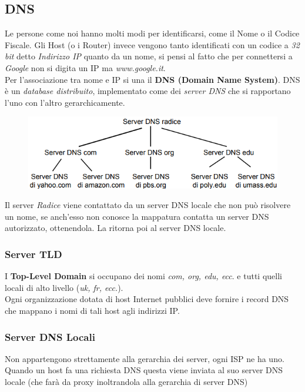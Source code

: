 \documentclass{article}
\begin{document}
        \subsection{DNS}
            Le persone come noi hanno molti modi per identificarsi, come il Nome o il Codice Fiscale. Gli Host (o i Router) invece vengono tanto identificati con un codice a \textit{32 bit} detto \textit{Indirizzo IP} quanto da un nome, si pensi al fatto che per connettersi a \textit{Google} non si digita un IP ma \textit{www.google.it}.\\
            Per l'associazione tra nome e IP si una il \textbf{DNS (Domain Name System)}. DNS è un \textit{database distribuito}, implementato come dei \textit{server DNS} che si rapportano l'uno con l'altro gerarchicamente.\\
            \begin{figure}[H]
                \centering
                \includegraphics[width=\textwidth]{pic/gerarchia_dns.png}
                \label{Gerarchia dei Server DNS}
            \end{figure}
            Il server \textit{Radice} viene contattato da un server DNS locale che non può risolvere un nome, se anch'esso non conosce la mappatura contatta un server DNS autorizzato, ottenendola. La ritorna poi al server DNS locale.

            \subsubsection{Server TLD}
                I \textbf{Top-Level Domain} si occupano dei nomi \textit{com, org, edu, ecc}. e tutti quelli locali di alto livello (\textit{uk, fr, ecc.}).\\
                Ogni organizzazione dotata di host Internet pubblici deve fornire i record DNS che mappano i nomi di tali host agli indirizzi IP. 

            \subsubsection{Server DNS Locali}
                Non appartengono strettamente alla gerarchia dei server, ogni ISP ne ha uno. Quando un host fa una richiesta DNS questa viene inviata al suo server DNS locale (che farà da proxy inoltrandola alla gerarchia di server DNS)
\end{document}
